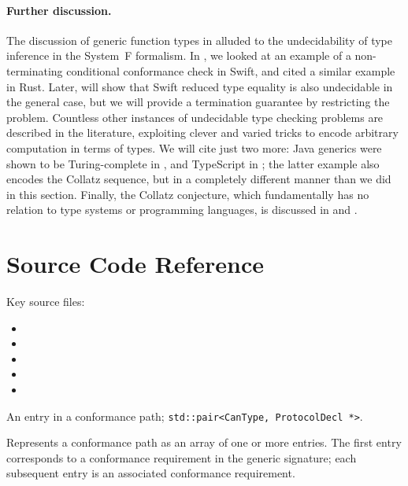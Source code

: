 \documentclass[../generics]{subfiles}
\begin{document}
\paragraph{Further discussion.}
The discussion of generic function types in  alluded to the undecidability of type inference in the System~F formalism. In , we looked at an example of a non-terminating conditional conformance check in Swift, and cited a similar example in Rust. Later,  will show that Swift reduced type equality is also undecidable in the general case, but we will provide a termination guarantee by restricting the problem. Countless other instances of undecidable type checking problems are described in the literature, exploiting clever and varied tricks to encode arbitrary computation in terms of types. We will cite just two more: Java generics were shown to be Turing-complete in \cite{java_undecidable}, and TypeScript in \cite{tscollatz}; the latter example also encodes the Collatz sequence, but in a completely different manner than we did in this section. Finally, the Collatz conjecture, which fundamentally has no relation to type systems or programming languages, is discussed in \cite{collatzbook} and \cite{wolframtag}.

\section{Source Code Reference}

Key source files:
\begin{itemize}
\item {}
\item {}
\item {}
\item {}
\item {}
\end{itemize}

An entry in a conformance path; \verb|std::pair<CanType, ProtocolDecl *>|.

Represents a conformance path as an array of one or more entries. The first entry corresponds to a conformance requirement in the generic signature; each subsequent entry is an associated conformance requirement.
\end{document}
